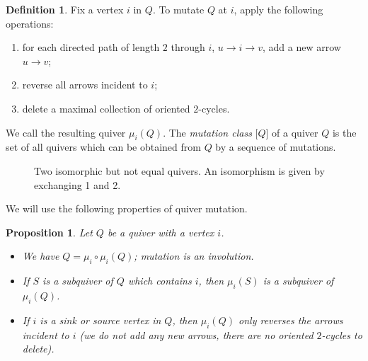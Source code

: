 \documentclass[11pt, letterpaper]{amsart}
\newtheorem{proposition}[theorem]{Proposition}
\theoremstyle{definition}
\newtheorem{definition}[theorem]{Definition}
\numberwithin{equation}{section}
\begin{document}
\begin{definition}
Fix a vertex $i$ in $Q$. 
To mutate $Q$ at $i$, apply the following operations:
\begin{enumerate}%
\item for each directed path of length $2$ through $i$, $u \rightarrow i \rightarrow v$, add a new arrow $u \rightarrow v$;
\item reverse all arrows incident to $i$;
\item delete a maximal collection of oriented $2$-cycles. %
\end{enumerate}
We call the resulting quiver $\mu_i(Q)$. 
The \emph{mutation class} $\big [Q \big ]$ of a quiver $Q$ is the set of all quivers which can be obtained from $Q$ by a sequence of mutations.
\end{definition}


\begin{figure}[ht]
    \centering
    \caption{Two isomorphic but not equal quivers. An isomorphism is given by exchanging 1 and 2.}
    \label{fig-non-equal-example}
\end{figure}

We will use the following properties of quiver mutation.

\begin{proposition}
    Let $Q$ be a quiver with a vertex $i$.
    \begin{itemize}%
        \item We have $Q = \mu_i \circ \mu_i(Q)$; mutation is an involution.
        \item If $S$ is a subquiver of $Q$ which contains $i$, then $\mu_i(S)$ is a subquiver of $\mu_i(Q)$.
        \item If $i$ is a sink or source vertex in $Q$, then $\mu_i(Q)$ only reverses the arrows incident to $i$ (we do not add any new arrows, there are no oriented $2$-cycles to delete).
    \end{itemize}
\end{proposition}
\end{document}
